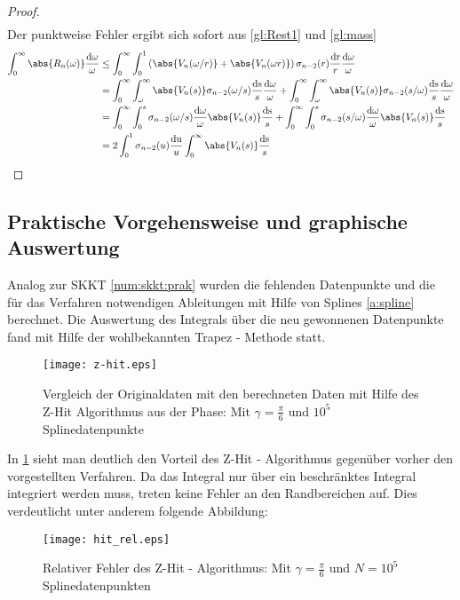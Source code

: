 \begin{satz}
\begin{proof}
\begin{align}
	 	\end{align}
	 	Der punktweise Fehler ergibt sich sofort aus \ref{gl:Rest1} und \ref{gl:mass}
	 	\begin{align}
	 		\int_0^{\infty} \abs{R_n(\omega)} \frac{\mathrm{d\omega}}{\omega} &\leq \int_0^{\infty} \int_0^1 \left(\abs{V_n(\omega/r)} + \abs{V_n({\omega r})}\right) \sigma_{n-2}(r) \frac{\mathrm{dr}}{r} \frac{\mathrm{d\omega}}{\omega}\\
	 		&= \int_0^{\infty} \int_{\omega}^{\infty} \abs{V_n(s)} \sigma_{n-2}(\omega/s) \frac{\mathrm{ds}}{s} \frac{\mathrm{d\omega}}{\omega} + \int_0^{\infty} \int_{\omega}^{\infty} \abs{V_n(s)} \sigma_{n-2}(s/\omega) \frac{\mathrm{ds}}{s} \frac{\mathrm{d\omega}}{\omega}\\
	 		&= \int_0^{\infty} \int_{0}^{s} \sigma_{n-2}(\omega/s) \frac{\mathrm{d\omega}}{\omega} \abs{V_n(s)} \frac{\mathrm{ds}}{s} + \int_0^{\infty} \int_{0}^{s} \sigma_{n-2}(s/\omega) \frac{\mathrm{d\omega}}{\omega} \abs{V_n(s)} \frac{\mathrm{ds}}{s}\\
	 		&= 2 \int_0^1 \sigma_{n-2} (u) \frac{\mathrm{du}}{u} \int_0^{\infty} \abs{V_n(s)} \frac{\mathrm{ds}}{s}
	 	\end{align}
	\end{proof}
\end{satz}
\subsection{Praktische Vorgehensweise und graphische Auswertung}\label{num:z-hit:prak}
Analog zur SKKT \ref{num:skkt:prak} wurden die fehlenden Datenpunkte und die für das Verfahren notwendigen Ableitungen mit Hilfe von Splines \ref{a:spline} berechnet. Die Auswertung des Integrals über die neu gewonnenen Datenpunkte fand mit Hilfe der wohlbekannten Trapez - Methode statt. 
\begin{figure}[!h] 
  \centering
     \texttt{[image: z-hit.eps]}
	 \caption{Vergleich der Originaldaten mit den berechneten Daten mit Hilfe des Z-Hit Algorithmus aus der Phase: Mit $\gamma = \frac{\pi}{6}$ und $10^5$ Splinedatenpunkte }
  \label{fig:z-hit}
\end{figure}
In \ref{fig:z-hit} sieht man deutlich den Vorteil des Z-Hit - Algorithmus gegenüber vorher den vorgestellten Verfahren. Da das Integral nur über ein beschränktes Integral integriert werden muss, treten keine Fehler an den Randbereichen auf. Dies verdeutlicht unter anderem folgende Abbildung:
\begin{figure}[!h]
	\texttt{[image: hit\_rel.eps]}
	\caption{Relativer Fehler des Z-Hit - Algorithmus: Mit $\gamma = \frac{\pi}{6}$ und $N = 10^5$ Splinedatenpunkten}
	\label{fig:z-hit_rel}
\end{figure}
\newpage

